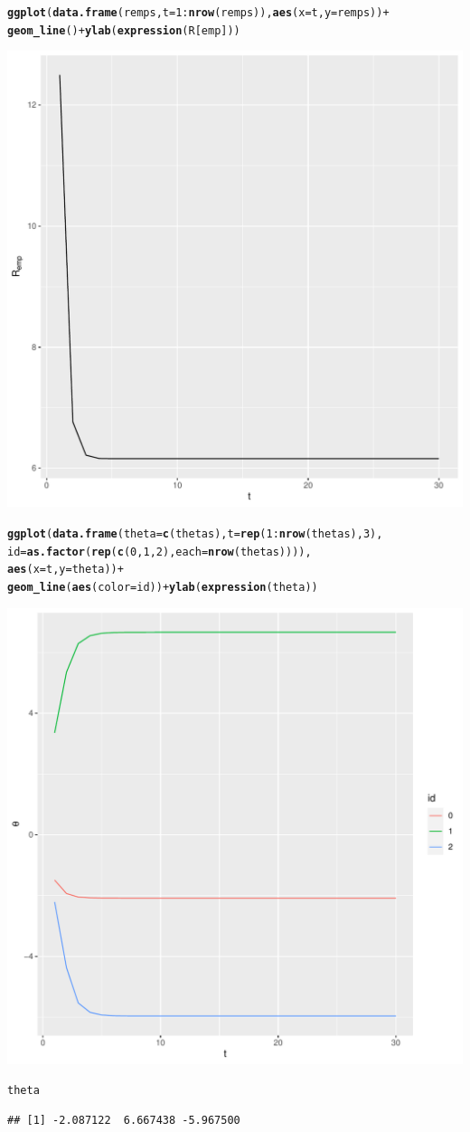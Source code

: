 \documentclass[a4paper]{article}
\makeatletter
\newcommand{\hlnum}[1]{\textcolor[rgb]{0.686,0.059,0.569}{#1}}%
\newcommand{\hlopt}[1]{\textcolor[rgb]{0,0,0}{#1}}%
\newcommand{\hlstd}[1]{\textcolor[rgb]{0.345,0.345,0.345}{#1}}%
\newcommand{\hlkwc}[1]{\textcolor[rgb]{0.333,0.667,0.333}{#1}}%
\newcommand{\hlkwd}[1]{\textcolor[rgb]{0.737,0.353,0.396}{\textbf{#1}}}%
\newenvironment{kframe}{%
 \def\at@end@of@kframe{}%
 \ifinner\ifhmode%
  \def\at@end@of@kframe{\end{minipage}}%
  \begin{minipage}{\columnwidth}%
 \fi\fi%
 \def\FrameCommand##1{\hskip\@totalleftmargin \hskip-\fboxsep
 \colorbox{shadecolor}{##1}\hskip-\fboxsep
     \hskip-\linewidth \hskip-\@totalleftmargin \hskip\columnwidth}%
 \MakeFramed {\advance\hsize-\width
   \@totalleftmargin\z@ \linewidth\hsize
   \@setminipage}}%
 {\par\unskip\endMakeFramed%
 \at@end@of@kframe}
\newenvironment{knitrout}{}{} %
\makeatother
\begin{document}
{\begin{enumerate}
\begin{knitrout}
\begin{kframe}
\begin{alltt}
\hlkwd{ggplot}\hlstd{(}\hlkwd{data.frame}\hlstd{(remps,} \hlkwc{t}\hlstd{=}\hlnum{1}\hlopt{:}\hlkwd{nrow}\hlstd{(remps)),} \hlkwd{aes}\hlstd{(}\hlkwc{x}\hlstd{=t,} \hlkwc{y}\hlstd{=remps))} \hlopt{+}
  \hlkwd{geom_line}\hlstd{()} \hlopt{+} \hlkwd{ylab}\hlstd{(}\hlkwd{expression}\hlstd{(R[emp]))}
\end{alltt}
\end{kframe}
\includegraphics[width=0.4\linewidth]{figure/gauss_newton-plot-1} 
\begin{kframe}\begin{alltt}
\hlkwd{ggplot}\hlstd{(}\hlkwd{data.frame}\hlstd{(}\hlkwc{theta} \hlstd{=} \hlkwd{c}\hlstd{(thetas),} \hlkwc{t}\hlstd{=}\hlkwd{rep}\hlstd{(}\hlnum{1}\hlopt{:}\hlkwd{nrow}\hlstd{(thetas),}\hlnum{3}\hlstd{),}
                \hlkwc{id} \hlstd{=} \hlkwd{as.factor}\hlstd{(}\hlkwd{rep}\hlstd{(}\hlkwd{c}\hlstd{(}\hlnum{0}\hlstd{,} \hlnum{1}\hlstd{,} \hlnum{2}\hlstd{),} \hlkwc{each}\hlstd{=} \hlkwd{nrow}\hlstd{(thetas)))),}
       \hlkwd{aes}\hlstd{(}\hlkwc{x} \hlstd{= t,} \hlkwc{y}\hlstd{=theta))} \hlopt{+}
  \hlkwd{geom_line}\hlstd{(}\hlkwd{aes}\hlstd{(}\hlkwc{color} \hlstd{= id))} \hlopt{+} \hlkwd{ylab}\hlstd{(}\hlkwd{expression}\hlstd{(theta))}
\end{alltt}
\end{kframe}
\includegraphics[width=0.4\linewidth]{figure/gauss_newton-plot-2} 
\begin{kframe}\begin{alltt}
\hlstd{theta}
\end{alltt}
\begin{verbatim}
## [1] -2.087122  6.667438 -5.967500
\end{verbatim}
\end{kframe}
\end{knitrout}
\end{enumerate}

}
\end{document}
